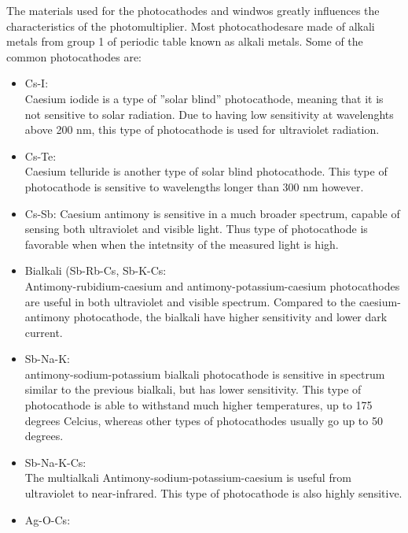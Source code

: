 The materials used for the photocathodes and windwos greatly influences the characteristics of the photomultiplier. Most photocathodesare made of alkali metals from group 1 of periodic table known as alkali metals. Some of the common photocathodes are:\\


\begin{itemize}

\item Cs-I:\\
Caesium iodide is a type of ”solar blind” photocathode, meaning that it is not sensitive to solar radiation. Due to having low sensitivity at wavelenghts above 200 nm, this type of photocathode is used for ultraviolet radiation. 
\\
\item Cs-Te:\\
Caesium telluride is another type of solar blind photocathode. This type of photocathode is sensitive to wavelengths longer than 300 nm however.
\\
\item Cs-Sb:
Caesium antimony is sensitive in a much broader spectrum, capable of sensing both ultraviolet and visible light. Thus type of photocathode is favorable when when the intetnsity of the measured light is high.
\\
\item Bialkali (Sb-Rb-Cs, Sb-K-Cs:\\ 
Antimony-rubidium-caesium and antimony-potassium-caesium photocathodes are useful in both ultraviolet and visible spectrum. Compared to the caesium-antimony photocathode, the bialkali have higher sensitivity and lower dark current.
\\
\item Sb-Na-K:\\
antimony-sodium-potassium bialkali photocathode is sensitive in spectrum similar to the previous bialkali, but has lower sensitivity. This type of photocathode is able to withstand much higher temperatures, up to 175 degrees Celcius, whereas other types of photocathodes usually go up to 50 degrees.
\\
\item Sb-Na-K-Cs:\\
The multialkali Antimony-sodium-potassium-caesium is useful from ultraviolet to near-infrared. This type of photocathode is also highly sensitive.
\\
\item Ag-O-Cs:\\ 

\end{itemize}
